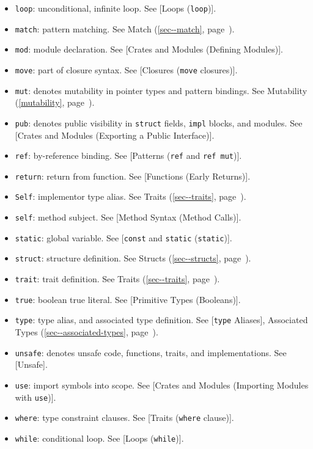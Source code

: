 \documentclass[a4paper,]{book}
\renewcommand*{\hyperref}[2][\ar]{%
  \def\ar{#2}%
  #2 (\autoref{#1}, page~\pageref{#1})}
\begin{document}
\begin{itemize}
\item
  \texttt{loop}: unconditional, infinite loop. See {[}Loops
  (\texttt{loop}){]}.
\item
  \texttt{match}: pattern matching. See \hyperref[sec--match]{Match}.
\item
  \texttt{mod}: module declaration. See {[}Crates and Modules (Defining
  Modules){]}.
\item
  \texttt{move}: part of closure syntax. See {[}Closures (\texttt{move}
  closures){]}.
\item
  \texttt{mut}: denotes mutability in pointer types and pattern
  bindings. See \hyperref[mutability]{Mutability}.
\item
  \texttt{pub}: denotes public visibility in \texttt{struct} fields,
  \texttt{impl} blocks, and modules. See {[}Crates and Modules
  (Exporting a Public Interface){]}.
\item
  \texttt{ref}: by-reference binding. See {[}Patterns (\texttt{ref} and
  \texttt{ref\ mut}){]}.
\item
  \texttt{return}: return from function. See {[}Functions (Early
  Returns){]}.
\item
  \texttt{Self}: implementor type alias. See
  \hyperref[sec--traits]{Traits}.
\item
  \texttt{self}: method subject. See {[}Method Syntax (Method Calls){]}.
\item
  \texttt{static}: global variable. See {[}\texttt{const} and
  \texttt{static} (\texttt{static}){]}.
\item
  \texttt{struct}: structure definition. See
  \hyperref[sec--structs]{Structs}.
\item
  \texttt{trait}: trait definition. See \hyperref[sec--traits]{Traits}.
\item
  \texttt{true}: boolean true literal. See {[}Primitive Types
  (Booleans){]}.
\item
  \texttt{type}: type alias, and associated type definition. See
  {[}\texttt{type} Aliases{]},
  \hyperref[sec--associated-types]{Associated Types}.
\item
  \texttt{unsafe}: denotes unsafe code, functions, traits, and
  implementations. See {[}Unsafe{]}.
\item
  \texttt{use}: import symbols into scope. See {[}Crates and Modules
  (Importing Modules with \texttt{use}){]}.
\item
  \texttt{where}: type constraint clauses. See {[}Traits (\texttt{where}
  clause){]}.
\item
  \texttt{while}: conditional loop. See {[}Loops (\texttt{while}){]}.
\end{itemize}
\end{document}
